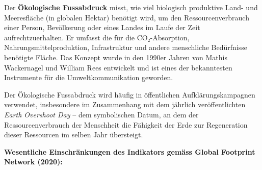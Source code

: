 \documentclass[
  nswissgerman,
  a4paper,
  openany]{book}
\begin{document}
\begin{tcolorbox}[enhanced jigsaw, arc=.35mm, bottomrule=.15mm, bottomtitle=1mm, breakable, colback=white, colbacktitle=quarto-callout-tip-color!10!white, colframe=quarto-callout-tip-color-frame, coltitle=black, left=2mm, leftrule=.75mm, opacityback=0, opacitybacktitle=0.6, rightrule=.15mm, title={Der Ökologische Fussabdruck -- Erklärung und Kritik}, titlerule=0mm, toprule=.15mm, toptitle=1mm]

Der \textbf{Ökologische Fussabdruck} misst, wie viel biologisch
produktive Land- und Meeresfläche (in globalen Hektar) benötigt wird, um
den Ressourcenverbrauch einer Person, Bevölkerung oder eines Landes im
Laufe der Zeit aufrechtzuerhalten. Er umfasst die für die
CO₂-Absorption, Nahrungsmittelproduktion, Infrastruktur und andere
menschliche Bedürfnisse benötigte Fläche. Das Konzept wurde in den
1990er Jahren von Mathis Wackernagel und William Rees entwickelt und ist
eines der bekanntesten Instrumente für die Umweltkommunikation geworden.

Der Ökologische Fussabdruck wird häufig in öffentlichen
Aufklärungskampagnen verwendet, insbesondere im Zusammenhang mit dem
jährlich veröffentlichten \emph{Earth Overshoot Day} -- dem symbolischen
Datum, an dem der Ressourcenverbrauch der Menschheit die Fähigkeit der
Erde zur Regeneration dieser Ressourcen im selben Jahr übersteigt.

\textbf{Wesentliche Einschränkungen des Indikators gemäss Global
Footprint Network (2020):}


\end{tcolorbox}
\end{document}
